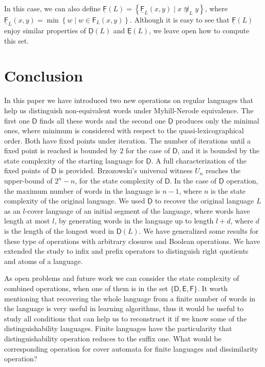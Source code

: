 \documentclass{article}
\newcommand{\diso}{\mathsf{D}}
\newcommand{\distmin}[1]{\underline{\mathsf{D}}(#1)}
\newcommand{\distmino}{\underline{\mathsf{D}}}
\newcommand{\dpreo}{\mathsf{E}}
\newcommand{\dpremin}[1]{\underline{\mathsf{E}}(#1)}
\newcommand{\dinfo}{\mathsf{F}}
\newcommand{\dinfmin}[1]{\underline{\mathsf{F}}(#1)}
\newcommand{\dinfminw}[2]{\underline{\mathsf{F}}_{#2}(#1)}
\newcommand{\dinfw}[2]{\mathsf{F}_{#1}(#2)}
\newcommand{\mntseq}[1]{\approxeq_{#1}}
\newcommand{\Set}[1]{\left\{ #1 \right\}}
\begin{document}
In this case, we can also define
$\dinfmin{L}=\Set{\dinfminw{x,y}{L} \mid  x\not\mntseq{L} y}$,
where 
$\dinfminw{x,y}{L} = \min\Set{w\mid w\in \dinfw{L}{x,y}}$. Although it is easy to see that $\dinfmin{L}$ enjoy similar properties of $\distmin{L}$ and $\dpremin{L}$, we leave open how to compute this set.



\section{Conclusion}
\label{sconc}


In this paper we have introduced two new operations on regular languages
that help us distinguish non-equivalent words under Myhill-Nerode equivalence.
The first one $\diso$ finds all these words and the second one $\distmino$
produces only the minimal ones, where minimum is considered with respect 
to the quasi-lexicographical order.
Both have fixed points under iteration. 
The number of iterations  until a fixed point is reached is bounded by $2$ for
the case of $\diso$, and it is bounded by the state complexity 
of the starting language for $\distmino$.
A full characterization of the fixed points of $\diso$ is provided. 
Brzozowski's universal witness $U_n$ reaches the upper-bound of $2^n-n$,
for the state complexity of $\diso$.
In the case of $\distmino$ operation, the maximum number of words in 
the language is $n-1$, where $n$ is the state complexity of the original language.
We used $\distmino$ to recover the original language $L$ as an $l$-cover language of 
an initial segment of the language, where words have length at most $l$, by generating 
words in the language up to length $l+d$, where $d$ is the length of the 
longest word in $\distmin{L}$.
We have generalized some results for these type of operations with arbitrary closures and 
Boolean operations.
We have extended the study to infix and prefix operators to distinguish right quotients and 
atoms of a language.

As open problems and future work we can consider the state complexity of combined
operations, when one of them is in the set $\{\diso,\dpreo,\dinfo\}$.
It worth mentioning that recovering the whole language from a finite number of words in the language
 is very useful in learning algorithms, thus  it would be useful to study all 
conditions that can help us to reconstruct it if we know some of the distinguishability languages.
Finite languages have the particularity that distinguishability operation reduces to the suffix one.
What would be corresponding operation for cover automata for finite languages and dissimilarity operation? 
\end{document}
